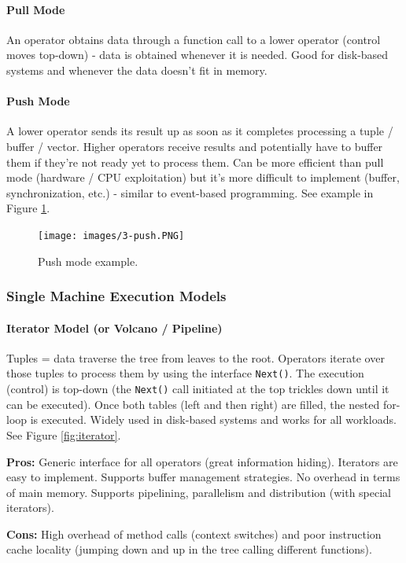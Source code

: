 \paragraph{Pull Mode}
An operator obtains data through a function call to a lower operator (control moves top-down) - data is obtained whenever it is needed. Good for disk-based systems and whenever the data doesn't fit in memory.

\paragraph{Push Mode}
A lower operator sends its result up as soon as it completes processing a tuple / buffer / vector. Higher operators receive results and potentially have to buffer them if they're not ready yet to process them. Can be more efficient than pull mode (hardware / CPU exploitation) but it's more difficult to implement (buffer, synchronization, etc.) - similar to event-based programming. See example in Figure \ref{fig:push}.

\begin{figure}[h]
	\centering
	\texttt{[image: images/3-push.PNG]}
	\caption{Push mode example.}
	\label{fig:push}
\end{figure}


\subsubsection{Single Machine Execution Models}


\paragraph{Iterator Model (or Volcano / Pipeline)}
Tuples = data traverse the tree from leaves to the root. Operators iterate over those tuples to process them by using the interface \texttt{Next()}. The execution (control) is top-down (the \texttt{Next()} call initiated at the top trickles down until it can be executed). Once both tables (left and then right) are filled, the nested for-loop is executed. Widely used in disk-based systems and works for all workloads. See Figure \ref{fig:iterator}.

\textbf{Pros:} Generic interface for all operators (great information hiding). Iterators are easy to implement. Supports buffer management strategies. No overhead in terms of main memory. Supports pipelining, parallelism and distribution (with special iterators).

\textbf{Cons:} High overhead of method calls (context switches) and poor instruction cache locality (jumping down and up in the tree calling different functions).

